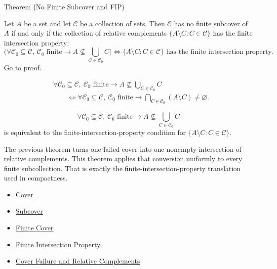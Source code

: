 \begin{theorembox}{Theorem (No Finite Subcover and FIP)}
\begin{theorem}\label{thm:no-finite-subcover-fip}
Let $A$ be a set and let $\mathcal{C}$ be a collection of sets. Then
$\mathcal{C}$ has no finite subcover of $A$ if and only if the collection of
relative complements $\{A\setminus C:C\in\mathcal{C}\}$ has the finite
intersection property:
\[
\bigl(\forall\mathcal{C}_0\subseteq\mathcal{C},\
\mathcal C_0\text{ finite}\to
A\not\subseteq\bigcup_{C\in\mathcal C_0}C\bigr)
\iff
\{A\setminus C:C\in\mathcal{C}\}\text{ has the finite intersection property}.
\]
\hyperref[prf:no-finite-subcover-fip]{Go to proof.}
\end{theorem}
\end{theorembox}

\begin{remark*}
\[
\begin{aligned}
&\forall\mathcal C_0\subseteq\mathcal C,\ 
\mathcal C_0\text{ finite}\to
A\not\subseteq\bigcup_{C\in\mathcal C_0}C\\
&\qquad\iff
\forall\mathcal C_0\subseteq\mathcal C,\ 
\mathcal C_0\text{ finite}\to
\bigcap_{C\in\mathcal C_0}(A\setminus C)\neq\varnothing.
\end{aligned}
\]
\end{remark*}

\begin{remark*}
\[
  \forall\mathcal C_0\subseteq\mathcal C,\ 
  \mathcal C_0\text{ finite}\to
  A\not\subseteq\bigcup_{C\in\mathcal C_0}C
\]
is equivalent to the finite-intersection-property condition for
\(\{A\setminus C:C\in\mathcal C\}\).
\end{remark*}

\begin{remark*}[Interpretation]
The previous theorem turns one failed cover into one nonempty intersection of
relative complements.  This theorem applies that conversion uniformly to every
finite subcollection.  That is exactly the finite-intersection-property
translation used in compactness.
\end{remark*}


\begin{dependencies}
\begin{itemize}
  \item \hyperref[def:cover-full]{Cover}
  \item \hyperref[def:subcover]{Subcover}
  \item \hyperref[def:finite-cover]{Finite Cover}
  \item \hyperref[def:fip]{Finite Intersection Property}
  \item \hyperref[thm:cover-failure-relative-complements]{Cover Failure and Relative Complements}
\end{itemize}
\end{dependencies}

